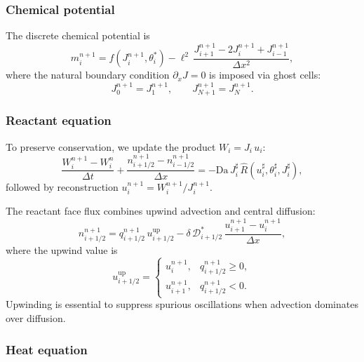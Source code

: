 \documentclass[aps,pre,reprint,superscriptaddress,longbibliography,floatfix]{revtex4-2}
\newcommand{\Ds}{\mathcal{D}}
\newcommand{\Da}{\mathrm{Da}}
\newcommand{\Rhat}{\widehat{R}}
\begin{document}
\subsubsection{Chemical potential}

The discrete chemical potential is
\begin{equation}
  m_i^{n+1}
  = f(J_i^{n+1},\theta_i^{*})
  - \ell^2\,\frac{J_{i+1}^{n+1} - 2J_i^{n+1} + J_{i-1}^{n+1}}{\Delta x^2},
  \label{eq:disc_m}
\end{equation}
where the natural boundary condition $\partial_x J = 0$ is imposed via ghost cells:
\begin{equation}
  J_0^{n+1} = J_1^{n+1}, \qquad J_{N+1}^{n+1} = J_N^{n+1}.
  \label{eq:ghost_J}
\end{equation}

\subsubsection{Reactant equation}

To preserve conservation, we update the product $W_i = J_i\,u_i$:
\begin{equation}
  \frac{W_i^{n+1} - W_i^{n}}{\Delta t}
  + \frac{n_{i+1/2}^{n+1} - n_{i-1/2}^{n+1}}{\Delta x}
  = -\Da\,J_i^{\sharp}\,\Rhat(u_i^{\sharp},\theta_i^{\sharp},J_i^{\sharp}),
  \label{eq:disc_W}
\end{equation}
followed by reconstruction $u_i^{n+1} = W_i^{n+1}/J_i^{n+1}$.

The reactant face flux combines upwind advection and central diffusion:
\begin{equation}
  n_{i+1/2}^{n+1}
  = q_{i+1/2}^{n+1}\,u_{i+1/2}^\mathrm{up}
  - \delta\,\Ds_{i+1/2}^{*}\,
  \frac{u_{i+1}^{n+1} - u_i^{n+1}}{\Delta x},
  \label{eq:disc_n}
\end{equation}
where the upwind value is
\begin{equation}
  u_{i+1/2}^\mathrm{up}
  = \begin{cases}
    u_i^{n+1}, & q_{i+1/2}^{n+1} \ge 0, \\[4pt]
    u_{i+1}^{n+1}, & q_{i+1/2}^{n+1} < 0.
  \end{cases}
  \label{eq:upwind}
\end{equation}
Upwinding is essential to suppress spurious oscillations when advection dominates over diffusion.

\subsubsection{Heat equation}
\end{document}

